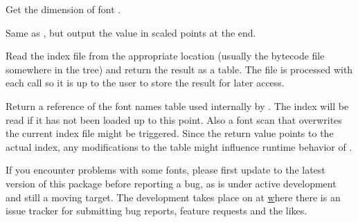             Get the dimension  of font .
  \endaltitem

            Same as , but output the value
            in scaled points at the \TEX end.
  \endaltitem

\endfunctionlist

\endsubsubsection


\beginfunctionlist
%
            Read the index file from the appropriate location (usually
            the bytecode file  somewhere
            in the  tree) and return the result as a
            table. The file is processed with each call so it is up to
            the user to store the result for later access.
  \endaltitem

            Return a reference of the font names table used internally
            by . The index will be read if it
            has not been loaded up to this point. Also a font scan that
            overwrites the current index file might be triggered. Since
            the return value points to the actual index, any
            modifications to the table might influence runtime behavior
            of .
  \endaltitem

\endfunctionlist

\endsubsubsection

\endsubsection
\endsection



If you encounter problems with some fonts, please first update to the
latest version of this package before reporting a bug, as
 is under active development and still a moving
target.
%
The development takes place on  at
\hyperlink {https://github.com/lualatex/luaotfload} where there is an issue
tracker for submitting bug reports, feature requests and the likes.

